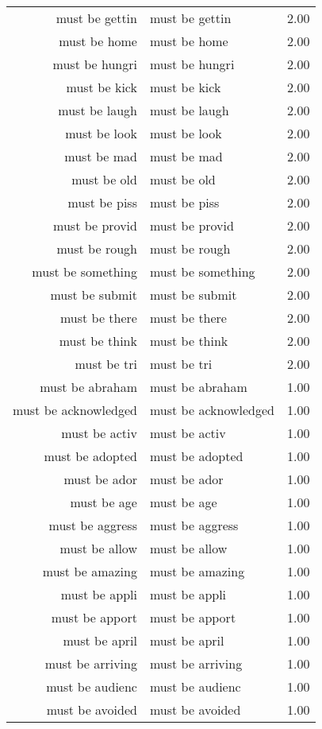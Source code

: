 \begin{table}[ht]
\begin{tabular}{rlr}
  must be gettin & must be gettin & 2.00 \\ 
  must be home & must be home & 2.00 \\ 
  must be hungri & must be hungri & 2.00 \\ 
  must be kick & must be kick & 2.00 \\ 
  must be laugh & must be laugh & 2.00 \\ 
  must be look & must be look & 2.00 \\ 
  must be mad & must be mad & 2.00 \\ 
  must be old & must be old & 2.00 \\ 
  must be piss & must be piss & 2.00 \\ 
  must be provid & must be provid & 2.00 \\ 
  must be rough & must be rough & 2.00 \\ 
  must be something & must be something & 2.00 \\ 
  must be submit & must be submit & 2.00 \\ 
  must be there & must be there & 2.00 \\ 
  must be think & must be think & 2.00 \\ 
  must be tri & must be tri & 2.00 \\ 
  must be abraham & must be abraham & 1.00 \\ 
  must be acknowledged & must be acknowledged & 1.00 \\ 
  must be activ & must be activ & 1.00 \\ 
  must be adopted & must be adopted & 1.00 \\ 
  must be ador & must be ador & 1.00 \\ 
  must be age & must be age & 1.00 \\ 
  must be aggress & must be aggress & 1.00 \\ 
  must be allow & must be allow & 1.00 \\ 
  must be amazing & must be amazing & 1.00 \\ 
  must be appli & must be appli & 1.00 \\ 
  must be apport & must be apport & 1.00 \\ 
  must be april & must be april & 1.00 \\ 
  must be arriving & must be arriving & 1.00 \\ 
  must be audienc & must be audienc & 1.00 \\ 
  must be avoided & must be avoided & 1.00 \\ 

\end{tabular}
\end{table}
